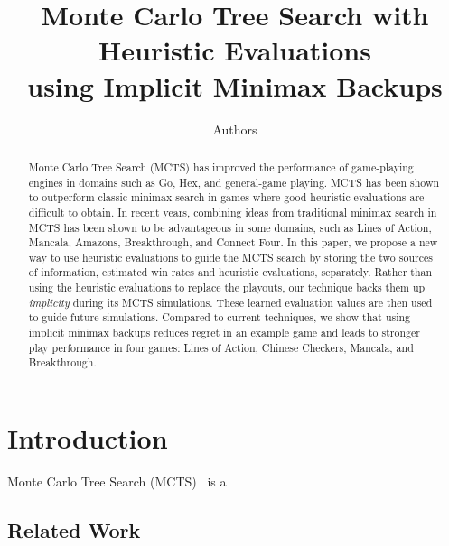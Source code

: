 \documentclass[letterpaper]{article}
\begin{document}
%
\title{Monte Carlo Tree Search with Heuristic Evaluations\\using Implicit Minimax Backups}
\author{Authors}

\maketitle

\begin{abstract}
Monte Carlo Tree Search (MCTS) has improved the performance of game-playing engines in 
domains such as Go, Hex, and general-game playing. MCTS has been shown to outperform 
classic minimax search in games where good heuristic evaluations are difficult to obtain. 
In recent years, combining 
ideas from traditional minimax search in MCTS has been shown to be advantageous in some domains,
such as Lines of Action, Mancala, Amazons, Breakthrough, and Connect Four. In this paper, we propose 
a new way to use heuristic evaluations to guide the MCTS search by storing the two sources of 
information, estimated win rates and heuristic evaluations, separately. 
Rather than using the heuristic evaluations to replace the playouts, 
our technique backs them up {\it implicity} during its MCTS simulations. 
These learned evaluation values are then used to guide future simulations. 
Compared to current techniques, we show that using implicit minimax backups  
reduces regret in an example game and leads to stronger 
play performance in four games: Lines of Action, Chinese Checkers, Mancala, and Breakthrough. 
\end{abstract}

\section{Introduction}

Monte Carlo Tree Search (MCTS)~\cite{mctssurvey,Coulom06Efficient,Kocsis06Bandit} is a 

\subsection{Related Work}
\end{document}

